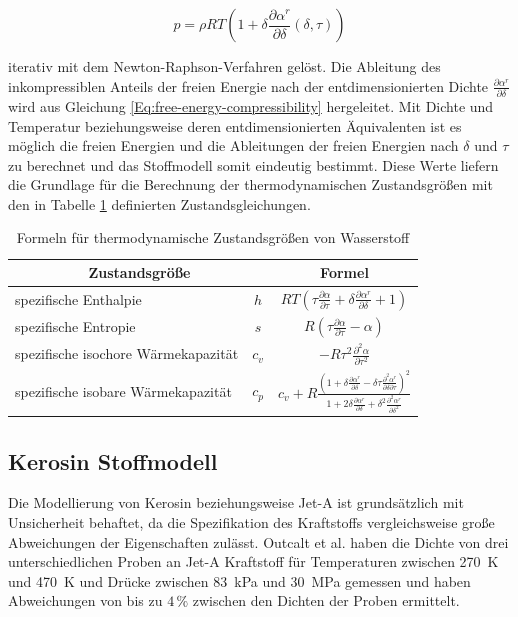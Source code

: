 \begin{equation}\label{Eq:pressure-guess}
	p=\rho RT\left(1+\delta\frac{\partial\alpha^r}{\partial\delta}(\delta, \tau)\right)
\end{equation}

iterativ mit dem Newton-Raphson-Verfahren gelöst. Die Ableitung des inkompressiblen Anteils der freien Energie nach der entdimensionierten Dichte $\frac{\partial\alpha^r}{\partial\delta}$ wird aus Gleichung \ref{Eq:free-energy-compressibility} hergeleitet. Mit Dichte und Temperatur beziehungsweise deren entdimensionierten Äquivalenten ist es möglich die freien Energien und die Ableitungen der freien Energien nach $\delta$ und $\tau$ zu berechnet und das Stoffmodell somit eindeutig bestimmt. Diese Werte liefern die Grundlage für die Berechnung der thermodynamischen Zustandsgrößen mit den in Tabelle \ref{Tab:thermodynamic_properties_h2} definierten Zustandsgleichungen.

\begin{table}[ht]
	\centering
	\caption{Formeln für thermodynamische Zustandsgrößen von Wasserstoff}
	\begin{tabular} {|l|c|c|} \hline%
		\multicolumn{2}{|c|}{Zustandsgröße}  & Formel\\ \hline\hline%
		spezifische Enthalpie &$h$ 		  & $RT(\tau\frac{\partial\alpha}{\partial\tau}+\delta\frac{\partial\alpha^r}{\partial\delta}+1)$ \\ \hline%
		spezifische Entropie& $s$ 		      &  $R(\tau\frac{\partial\alpha}{\partial\tau}-\alpha)$\\ \hline%
		spezifische isochore Wärmekapazität &$c_v$ 	    &  $-R\tau^2\frac{\partial^2\alpha}{\partial\tau^2}$\\ \hline%
		spezifische isobare Wärmekapazität &$c_p$        &  $c_v+R\frac{\left(1+\delta\frac{\partial\alpha^r}{\partial\delta}-\delta\tau\frac{\partial^2\alpha^r}{\partial\delta\partial\tau}\right)^2}{1+2\delta\frac{\partial\alpha^r}{\partial\delta}+\delta^2\frac{\partial^2\alpha^r}{\partial\delta^2}}$\\ \hline%
	\end{tabular}	
	\label{Tab:thermodynamic_properties_h2}%
\end{table}
\FloatBarrier 

\subsection{Kerosin Stoffmodell}

Die Modellierung von Kerosin beziehungsweise Jet-A ist grundsätzlich mit Unsicherheit behaftet, da die Spezifikation des Kraftstoffs vergleichsweise große Abweichungen der Eigenschaften zulässt. Outcalt et al. \cite{Outcalt.2009} haben die Dichte von drei unterschiedlichen Proben an Jet-A Kraftstoff für Temperaturen zwischen \SI{270}{\K} und \SI{470}{\K} und Drücke zwischen \SI{83}{\kilo\Pa} und \SI{30}{\mega\Pa} gemessen und haben Abweichungen von bis zu $4\,\%$ zwischen den Dichten der Proben ermittelt.

